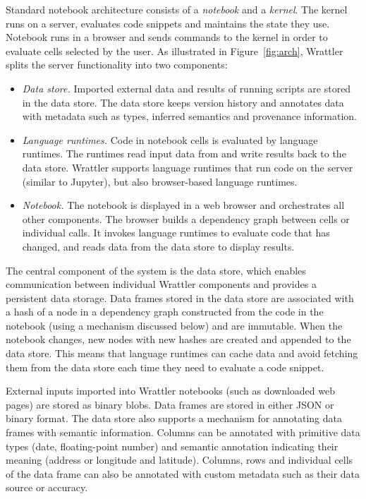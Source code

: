 \documentclass[fleqn,11pt]{report}
\theoremstyle{definition}
\newenvironment{nitemize}
{ \vspace{-0.4em}
  \begin{itemize}
    \setlength{\itemsep}{5pt}
    \setlength{\parskip}{0pt}
    \setlength{\parsep}{0pt} }
{ \end{itemize}
  \vspace{-0.4em} }
\begin{document}
Standard notebook architecture consists of a \emph{notebook} and a \emph{kernel}. The kernel
runs on a server, evaluates code snippets and maintains the state they use.
Notebook runs in a browser and sends commands to the kernel in order to evaluate
cells selected by the user. As illustrated in Figure~\ref{fig:arch}, Wrattler splits the
server functionality into two components:

\begin{nitemize}
\item \emph{Data store.} Imported external data and results of running scripts
are stored in the data store. The data store keeps version history and annotates data with
metadata such as types, inferred semantics and provenance information.

\item \emph{Language runtimes.} Code in notebook cells is evaluated by language runtimes.
The runtimes read input data from and write results back to the data store. Wrattler supports
language runtimes that run code on the server (similar to Jupyter), but also browser-based
language runtimes.

\item \emph{Notebook.} The notebook is displayed in a web browser and orchestrates
all other components. The browser builds a dependency graph between cells or individual
calls. It invokes language runtimes to evaluate code that has changed,
and reads data from the data store to display results.
\end{nitemize}

The central component of the system is the data store, which enables communication between
individual Wrattler components and provides a persistent data storage.
Data frames stored in the data store are associated with a hash of a node in a dependency
graph constructed from the code in the notebook (using a mechanism discussed below)
and are immutable. When the notebook changes, new nodes with new hashes are created and
appended to the data store. This means that language runtimes can cache data and avoid
fetching them from the data store each time they need to evaluate a code snippet.

External inputs imported into Wrattler notebooks (such as downloaded web pages) are stored as
binary blobs. Data frames are stored in either JSON or binary format.
The data store also supports a mechanism for annotating data frames with
semantic information. Columns can be annotated with primitive data types (date, floating-point
number) and semantic annotation indicating their meaning (address or longitude and latitude).
Columns, rows and individual cells of the data frame can also be annotated with custom metadata
such as their data source or accuracy.
\end{document}
